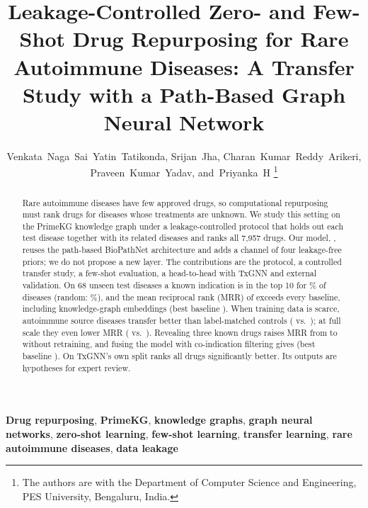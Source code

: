 \documentclass[journal]{IEEEtran}
\begin{document}
\title{Leakage-Controlled Zero- and Few-Shot Drug Repurposing for Rare Autoimmune Diseases: A Transfer Study with a Path-Based Graph Neural Network}

\author{Venkata~Naga~Sai~Yatin~Tatikonda, Srijan~Jha, Charan~Kumar~Reddy~Arikeri, Praveen~Kumar~Yadav, and~Priyanka~H%
\thanks{The authors are with the Department of Computer Science and Engineering, PES University, Bengaluru, India.}}


\maketitle

\begin{abstract}
Rare autoimmune diseases have few approved drugs, so computational repurposing must rank drugs for diseases whose treatments are unknown. We study this setting on the PrimeKG knowledge graph under a leakage-controlled protocol that holds out each test disease together with its related diseases and ranks all 7,957 drugs. Our model, \sysname, reuses the path-based BioPathNet architecture and adds a channel of four leakage-free priors; we do not propose a new layer. The contributions are the protocol, a controlled transfer study, a few-shot evaluation, a head-to-head with TxGNN and external validation. On 68 unseen test diseases a known indication is in the top 10 for \TabModelTestAnyTen\% of diseases (random: \RandExpAnyTenTest\%), and the mean reciprocal rank (MRR) of \TestMrr{} exceeds every baseline, including knowledge-graph embeddings (best baseline \KnnTestMrr). When training data is scarce, autoimmune source diseases transfer better than label-matched controls (\TrAEMrr{} vs.\ \TrActlEMrr); at full scale they even lower MRR (\TrCEEMrr{} vs.\ \TrDEMrr). Revealing three known drugs raises MRR from \FsBppZeroMrr{} to \FsBppThreeMrr{} without retraining, and fusing the model with co-indication filtering gives \FsRrfThreeMrr{} (best baseline \FsKnnCoindThreeMrr). On TxGNN's own split \sysname ranks all drugs significantly better. Its outputs are hypotheses for expert review.
\end{abstract}

\begin{IEEEkeywords}
\textbf{Drug repurposing}, \textbf{PrimeKG}, \textbf{knowledge graphs}, \textbf{graph neural networks}, \textbf{zero-shot learning}, \textbf{few-shot learning}, \textbf{transfer learning}, \textbf{rare autoimmune diseases}, \textbf{data leakage}
\end{IEEEkeywords}
\end{document}
